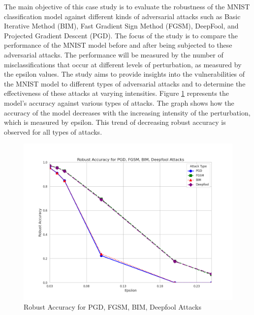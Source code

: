 \documentclass[10pt, conference, a4paper, final]{IEEEtran}
\begin{document}
The main objective of this case study is to evaluate the robustness of the MNIST classification model 
against different kinds of adversarial attacks such as Basic Iterative Method (BIM), Fast Gradient Sign Method (FGSM), 
DeepFool, and Projected Gradient Descent (PGD). The focus of the study is to compare the performance of the MNIST model
before and after being subjected to these adversarial attacks. The performance will be measured by the number of misclassifications
that occur at different levels of perturbation, as measured by the epsilon values. The study aims to provide insights into the
vulnerabilities of the MNIST model to different types of adversarial attacks and to determine the effectiveness of these attacks 
at varying intensities. Figure \ref {fig:robust_accuracy_attacks} represents the model's accuracy against various types of attacks. 
The graph shows how the accuracy of the model decreases with the increasing intensity of the perturbation, which is measured by epsilon.
This trend of decreasing robust accuracy is observed for all types of attacks.



\begin{figure}[ht]
    \centering
    \includegraphics[width=\linewidth]{paper_images/robust.png}
    \caption{Robust Accuracy for PGD, FGSM, BIM, Deepfool Attacks}
    \label{fig:robust_accuracy_attacks}
\end{figure}
\end{document}
